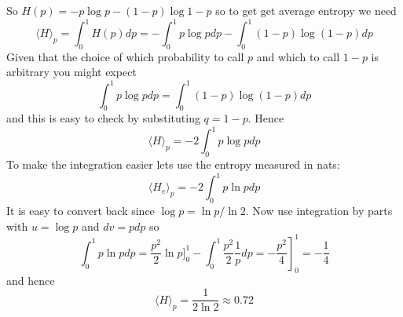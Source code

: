 \documentclass[12pt]{article}
\begin{document}
So $H(p)=-p\log{p}-(1-p)\log{1-p}$ so to get get average entropy we need
\begin{equation}
\langle H\rangle_p =  \int_0^1 H(p)dp=-\int_0^1 p\log{p}dp -\int_0^1 (1-p)\log{(1-p)}dp
\end{equation}
Given that the choice of which probability to call $p$ and which to call $1-p$ is arbitrary you might expect 
\begin{equation}
  \int_0^1 p\log{p}dp =\int_0^1 (1-p)\log{(1-p)}dp
\end{equation}
and this is easy to check by substituting $q=1-p$. Hence
\begin{equation}
  \langle H\rangle_p =-2\int_0^1 p\log{p}dp
\end{equation}
To make the integration easier lets use the entropy measured in nats:
\begin{equation}
  \langle H_e\rangle_p =-2\int_0^1 p\ln{p}dp
\end{equation}
It is easy to convert back since $\log{p}=\ln{p}/\ln{2}$. Now use integration by parts with $u=\log{p}$ and $dv=pdp$ so
\begin{equation}
  \int_0^1 p\ln{p}dp=\frac{p^2}{2}\ln{p}]_0^1-\int_0^1\frac{p^2}{2}\frac{1}{p}dp=-\left.\frac{p^2}{4}\right]_0^1=-\frac{1}{4}
\end{equation}
and hence
\begin{equation}
  \langle H\rangle_p =\frac{1}{2\ln{2}}\approx 0.72
\end{equation}
\end{document}
